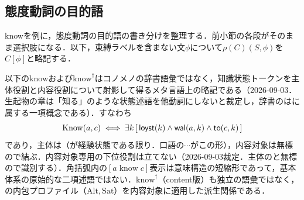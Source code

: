 \documentclass[../../main-detail.tex]{subfiles}
\begin{document}
\subsection{態度動詞の目的語}
knowを例に，態度動詞の目的語の書き分けを整理する．前小節の各段がそのまま選択肢になる．以下，束縛ラベルを含まない文$\phi$について$\rho(C)(S,\phi)$を$C[\phi]$と略記する．
\begin{remark}[knowは略記である]
    以下の$\mathrm{know}$および$\mathrm{know}^\dagger$はコノメノの辞書語彙ではなく，知識状態トークンを主体役割と内容役割について射影して得るメタ言語上の略記である（2026-09-03．生起物の章は「知る」のような状態述語を他動詞にしないと裁定し，辞書のはに属する一項概念である）．すなわち
    \[
        \mathrm{Know}(a,c) \iff \exists k\,[\,\textsf{loyst}(k)\land \textsf{wal}(a,k)\land \textsf{to}(c,k)\,]
    \]
    であり，主体は（が経験状態である限り．口語の$\cdots$がこの形），内容対象は無標ので結ぶ．内容対象専用の下位役割は立てない（2026-09-03裁定．主体のと無標ので識別する）．角括弧内の$[a\; \mathrm{know}\; c]$表示は意味構造の短縮形であって，基本体系の原始的な二項述語ではない．$\mathrm{know}^\dagger$（content版）も独立の語彙ではなく，の内包プロファイル（$\mathrm{Alt},\mathrm{Sat}$）を内容対象に適用した派生関係である．
\end{remark}
\end{document}
